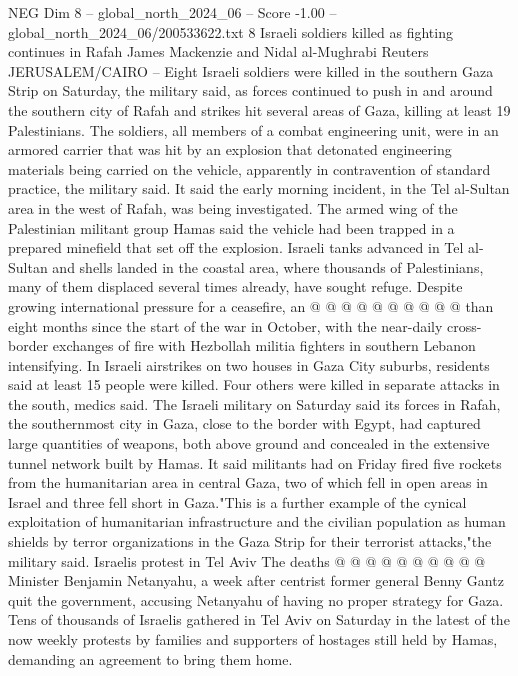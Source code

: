 \begin{textsample}{NEG Dim 8 – global\_north\_2024\_06 – Score -1.00 – global\_north\_2024\_06/200533622.txt}  \label{ex:f8_neg_192}
8 Israeli soldiers killed as fighting continues in Rafah James Mackenzie and Nidal al-Mughrabi Reuters JERUSALEM/CAIRO -- Eight Israeli soldiers were killed in the southern Gaza Strip on Saturday, the military said, as forces continued to push in and around the southern city of Rafah and strikes hit several areas of Gaza, killing at least 19 Palestinians.
The soldiers, all members of a combat engineering unit, were in an armored carrier that was hit by an explosion that detonated engineering materials being carried on the vehicle, apparently in contravention of standard practice, the military said.
It said the early morning incident, in the Tel al-Sultan area in the west of Rafah, was being investigated.
The armed wing of the Palestinian militant group Hamas said the vehicle had been trapped in a prepared minefield that set off the explosion.
Israeli tanks advanced in Tel al-Sultan and shells landed in the coastal area, where thousands of Palestinians, many of them displaced several times already, have sought refuge.
Despite growing international pressure for a ceasefire, an @ @ @ @ @ @ @ @ @ @ than eight months since the start of the war in October, with the near-daily cross-border exchanges of fire with Hezbollah militia fighters in southern Lebanon intensifying.
In Israeli airstrikes on two houses in Gaza City suburbs, residents said at least 15 people were killed.
Four others were killed in separate attacks in the south, medics said.
The Israeli military on Saturday said its forces in Rafah, the southernmost city in Gaza, close to the border with Egypt, had captured large quantities of weapons, both above ground and concealed in the extensive tunnel network built by Hamas.
It said militants had on Friday fired five rockets from the humanitarian area in central Gaza, two of which fell in open areas in Israel and three fell short in Gaza."This is a further example of the cynical exploitation of humanitarian infrastructure and the civilian population as human shields by terror organizations in the Gaza Strip for their terrorist attacks,"the military said.
Israelis protest in Tel Aviv The deaths @ @ @ @ @ @ @ @ @ @ Minister Benjamin Netanyahu, a week after centrist former general Benny Gantz quit the government, accusing Netanyahu of having no proper strategy for Gaza.
Tens of thousands of Israelis gathered in Tel Aviv on Saturday in the latest of the now weekly protests by families and supporters of hostages still held by Hamas, demanding an agreement to bring them home.

\end{textsample}
